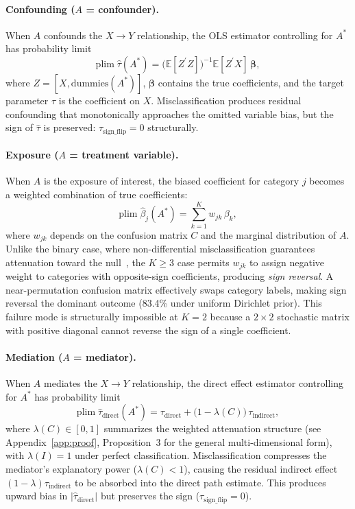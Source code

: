 \paragraph{Confounding ($A$ = confounder).}
When $A$ confounds the $X{\to}Y$ relationship, the OLS estimator controlling for $A^*$ has probability limit
\begin{equation}
\label{eq:confounding}
\text{plim}\;\hat{\tau}(A^*) = \bigl(\mathbb{E}[Z^{\prime}Z]\bigr)^{-1}\mathbb{E}[Z^{\prime}X]\,\boldsymbol{\beta},
\end{equation}
where $Z = [X, \text{dummies}(A^*)]$, $\boldsymbol{\beta}$ contains the true coefficients, and the target parameter $\tau$ is the coefficient on $X$. Misclassification produces residual confounding that monotonically approaches the omitted variable bias, but the sign of $\hat{\tau}$ is preserved: $\tau_{\text{sign\_flip}} = 0$ structurally.

\paragraph{Exposure ($A$ = treatment variable).}
When $A$ is the exposure of interest, the biased coefficient for category $j$ becomes a weighted combination of true coefficients:
\begin{equation}
\label{eq:exposure}
\text{plim}\;\hat{\beta}_j(A^*) = \sum_{k=1}^{K} w_{jk}\,\beta_k,
\end{equation}
where $w_{jk}$ depends on the confusion matrix $C$ and the marginal distribution of $A$. Unlike the binary case, where non-differential misclassification guarantees attenuation toward the null~\cite{brenner1993}, the $K{\geq}3$ case permits $w_{jk}$ to assign negative weight to categories with opposite-sign coefficients, producing \emph{sign reversal}. A near-permutation confusion matrix effectively swaps category labels, making sign reversal the dominant outcome (83.4\% under uniform Dirichlet prior). This failure mode is structurally impossible at $K{=}2$ because a $2{\times}2$ stochastic matrix with positive diagonal cannot reverse the sign of a single coefficient.

\paragraph{Mediation ($A$ = mediator).}
When $A$ mediates the $X{\to}Y$ relationship, the direct effect estimator controlling for $A^*$ has probability limit
\begin{equation}
\label{eq:mediation}
\text{plim}\;\hat{\tau}_{\text{direct}}(A^*) = \tau_{\text{direct}} + \bigl(1 - \lambda(C)\bigr)\,\tau_{\text{indirect}},
\end{equation}
where $\lambda(C) \in [0,1]$ summarizes the weighted attenuation structure (see Appendix~\ref{app:proof}, Proposition~3 for the general multi-dimensional form), with $\lambda(I) = 1$ under perfect classification. Misclassification compresses the mediator's explanatory power ($\lambda(C) < 1$), causing the residual indirect effect $(1{-}\lambda)\tau_{\text{indirect}}$ to be absorbed into the direct path estimate. This produces upward bias in $|\hat{\tau}_{\text{direct}}|$ but preserves the sign ($\tau_{\text{sign\_flip}} = 0$).

